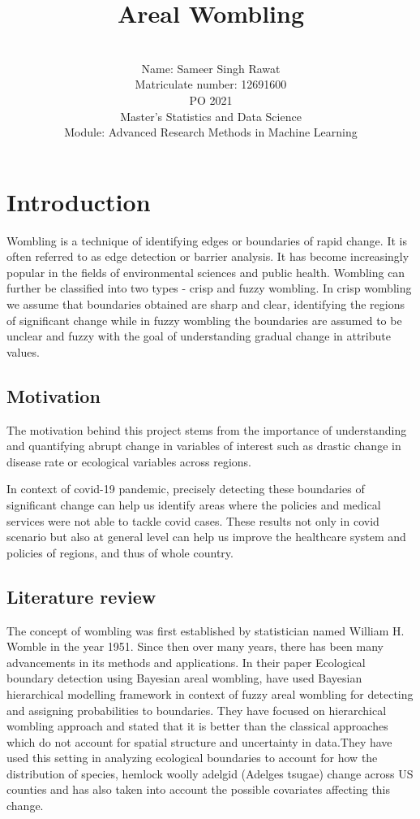 \documentclass[enabledeprecatedfontcommands,parskip=half,twoside=semi,BCOR=0mm]{scrreprt}
\title{Areal Wombling}
\author{\\
Name: Sameer Singh Rawat\\
Matriculate number: 12691600\\
PO 2021\\
Master's Statistics and Data Science\\
Module: Advanced Research Methods in Machine Learning}
\date{}
\numberwithin{equation}{chapter}
\theoremstyle{definition}
\theoremstyle{remark}
\begin{document}

	
    \maketitle
    
    \tableofcontents
	\newpage
    
    \chapter{Introduction}
    Wombling is a technique of identifying edges or boundaries of rapid change. It is often referred to as edge detection or barrier analysis. It has become increasingly popular in the fields of environmental sciences and public health. Wombling can further be classified into two types - crisp and fuzzy wombling. In crisp wombling we assume that boundaries obtained are sharp and clear, identifying the regions of significant change while in fuzzy wombling the boundaries are assumed to be unclear and fuzzy with the goal of understanding gradual change in attribute values.
    
    \section{Motivation}
    The motivation behind this project stems from the importance of understanding and quantifying abrupt change in variables of interest such as drastic change in disease rate or ecological variables across regions.
    
    In context of covid-19 pandemic, precisely detecting these boundaries of significant change can help us identify areas where the policies and medical services were not able to tackle covid cases. These results not only in covid scenario but also at general level can help us improve the healthcare system and policies of regions, and thus of whole country.  
    
    \section{Literature review}
    The concept of wombling was first established by statistician named William H. Womble in the year 1951. Since then over many years, there has been many advancements in its methods and applications. In their paper Ecological boundary detection using Bayesian areal wombling, \cite{Fitzpatrick.2010} have used Bayesian hierarchical modelling framework in context of fuzzy areal wombling for detecting and assigning probabilities to boundaries. They have focused on hierarchical wombling approach and stated that it is better than the classical approaches which do not account for spatial structure and uncertainty in data.They have used this setting in analyzing ecological boundaries to account for how the distribution of species, hemlock woolly adelgid (Adelges tsugae) change across US counties and has also taken into account the possible covariates affecting this change.
\end{document}
